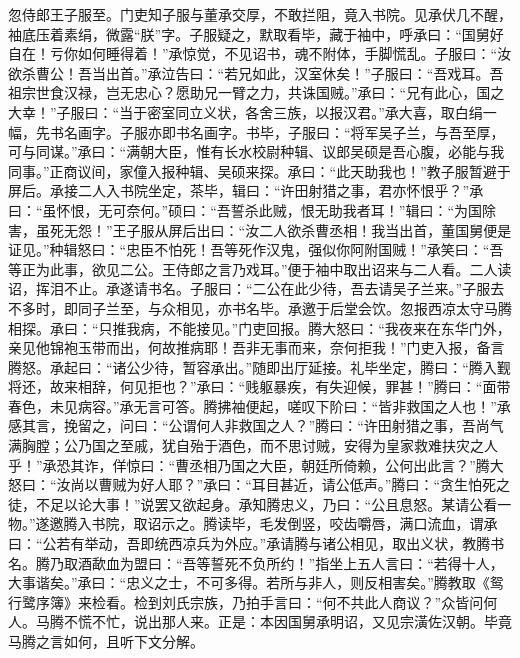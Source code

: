 忽侍郎王子服至。门吏知子服与董承交厚，不敢拦阻，竟入书院。见承伏几不醒，袖底压着素绢，微露“朕”字。子服疑之，默取看毕，藏于袖中，呼承曰：“国舅好自在！亏你如何睡得着！”承惊觉，不见诏书，魂不附体，手脚慌乱。子服曰：“汝欲杀曹公！吾当出首。”承泣告曰：“若兄如此，汉室休矣！”子服曰：“吾戏耳。吾祖宗世食汉禄，岂无忠心？愿助兄一臂之力，共诛国贼。”承曰：“兄有此心，国之大幸！”子服曰：“当于密室同立义状，各舍三族，以报汉君。”承大喜，取白绢一幅，先书名画字。子服亦即书名画字。书毕，子服曰：“将军吴子兰，与吾至厚，可与同谋。”承曰：“满朝大臣，惟有长水校尉种辑、议郎吴硕是吾心腹，必能与我同事。”正商议间，家僮入报种辑、吴硕来探。承曰：“此天助我也！”教子服暂避于屏后。承接二人入书院坐定，茶毕，辑曰：“许田射猎之事，君亦怀恨乎？”承曰：“虽怀恨，无可奈何。”硕曰：“吾誓杀此贼，恨无助我者耳！”辑曰：“为国除害，虽死无怨！”王子服从屏后出曰：“汝二人欲杀曹丞相！我当出首，董国舅便是证见。”种辑怒曰：“忠臣不怕死！吾等死作汉鬼，强似你阿附国贼！”承笑曰：“吾等正为此事，欲见二公。王侍郎之言乃戏耳。”便于袖中取出诏来与二人看。二人读诏，挥泪不止。承遂请书名。子服曰：“二公在此少待，吾去请吴子兰来。”子服去不多时，即同子兰至，与众相见，亦书名毕。承邀于后堂会饮。忽报西凉太守马腾相探。承曰：“只推我病，不能接见。”门吏回报。腾大怒曰：“我夜来在东华门外，亲见他锦袍玉带而出，何故推病耶！吾非无事而来，奈何拒我！”门吏入报，备言腾怒。承起曰：“诸公少待，暂容承出。”随即出厅延接。礼毕坐定，腾曰：“腾入觐将还，故来相辞，何见拒也？”承曰：“贱躯暴疾，有失迎候，罪甚！”腾曰：“面带春色，未见病容。”承无言可答。腾拂袖便起，嗟叹下阶曰：“皆非救国之人也！”承感其言，挽留之，问曰：“公谓何人非救国之人？”腾曰：“许田射猎之事，吾尚气满胸膛；公乃国之至戚，犹自殆于酒色，而不思讨贼，安得为皇家救难扶灾之人乎！”承恐其诈，佯惊曰：“曹丞相乃国之大臣，朝廷所倚赖，公何出此言？”腾大怒曰：“汝尚以曹贼为好人耶？”承曰：“耳目甚近，请公低声。”腾曰：“贪生怕死之徒，不足以论大事！”说罢又欲起身。承知腾忠义，乃曰：“公且息怒。某请公看一物。”遂邀腾入书院，取诏示之。腾读毕，毛发倒竖，咬齿嚼唇，满口流血，谓承曰：“公若有举动，吾即统西凉兵为外应。”承请腾与诸公相见，取出义状，教腾书名。腾乃取酒歃血为盟曰：“吾等誓死不负所约！”指坐上五人言曰：“若得十人，大事谐矣。”承曰：“忠义之士，不可多得。若所与非人，则反相害矣。”腾教取《鸳行鹭序簿》来检看。检到刘氏宗族，乃拍手言曰：“何不共此人商议？”众皆问何人。马腾不慌不忙，说出那人来。正是：本因国舅承明诏，又见宗潢佐汉朝。毕竟马腾之言如何，且听下文分解。
